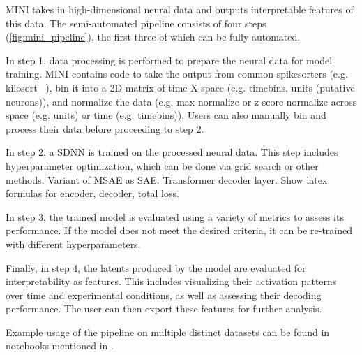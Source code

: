 MINI takes in high-dimensional neural data and outputs interpretable features of this data. The semi-automated pipeline consists of four steps (\autoref{fig:mini_pipeline}), the first three of which can be fully automated.

In step 1, data processing is performed to prepare the neural data for model training. MINI contains code to take the output from common spikesorters (e.g. kilosort ~\cite{pachitariu_2016_kilosort}), bin it into a 2D matrix of time X space (e.g. timebins, units (putative neurons)), and normalize the data (e.g. max normalize or z-score normalize across space (e.g. units) or time (e.g. timebins)). Users can also manually bin and process their data before proceeding to step 2.

In step 2, a SDNN is trained on the processed neural data. This step includes hyperparameter optimization, which can be done via grid search or other methods. Variant of MSAE as SAE. Transformer decoder layer. Show latex formulas for encoder, decoder, total loss.

In step 3, the trained model is evaluated using a variety of metrics to assess its performance. If the model does not meet the desired criteria, it can be re-trained with different hyperparameters. 

Finally, in step 4, the latents produced by the model are evaluated for interpretability as features. This includes visualizing their activation patterns over time and experimental conditions, as well as assessing their decoding performance. The user can then export these features for further analysis.

Example usage of the pipeline on multiple distinct datasets can be found in notebooks mentioned in .

